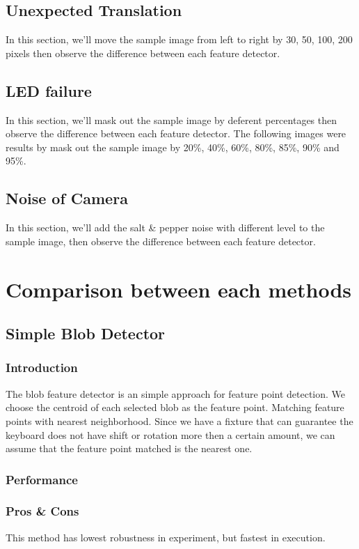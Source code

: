 	\subsection{Unexpected Translation}
		In this section, we'll move the sample image from left to right by 30, 50, 100, 200 pixels then observe the difference between each feature detector.
	\subsection{LED failure}
		In this section, we'll mask out the sample image by deferent percentages then observe the difference between each feature detector.
		The following images were results by mask out the sample image by 20\%, 40\%, 60\%, 80\%, 85\%, 90\% and 95\%.
	\subsection{Noise of Camera}
		In this section, we'll add the salt \& pepper noise with different level to the sample image, then observe the difference between each feature detector.

\section{Comparison between each methods}
	\subsection{Simple Blob Detector}
		\subsubsection{Introduction}
			The blob feature detector is an simple approach for feature point detection. We choose the centroid of each selected blob as the feature point. Matching feature points with nearest neighborhood. 
			Since we have a fixture that can guarantee the keyboard does not have shift or rotation more then a certain amount, we can assume that the feature point matched is the nearest one.
		\subsubsection{Performance}
		\subsubsection{Pros \& Cons}
			This method has lowest robustness in experiment, but fastest in execution.

